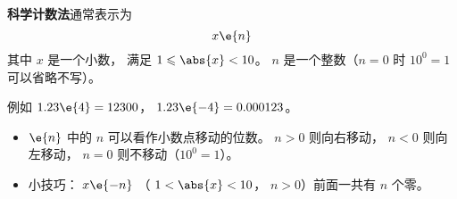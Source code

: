 
\begin{issues}
\issueDraft
\end{issues}

\textbf{科学计数法}通常表示为
\begin{equation}
x \e{n}
\end{equation}
其中 $x$ 是一个小数， 满足 $1 \leqslant \abs{x} < 10$。 $n$ 是一个整数（$n=0$ 时 $10^{0} = 1$ 可以省略不写）。

例如 $1.23\e{4} = 12300$， $1.23\e{-4} = 0.000123$。

\begin{itemize}
\item $\e{n}$ 中的 $n$ 可以看作小数点移动的位数。 $n > 0$ 则向右移动， $n < 0$ 则向左移动， $n=0$ 则不移动（$10^{0} = 1$）。
\item 小技巧： $x\e{-n}$ （ $1 < \abs{x} < 10$， $n > 0$）前面一共有 $n$ 个零。
\end{itemize}
